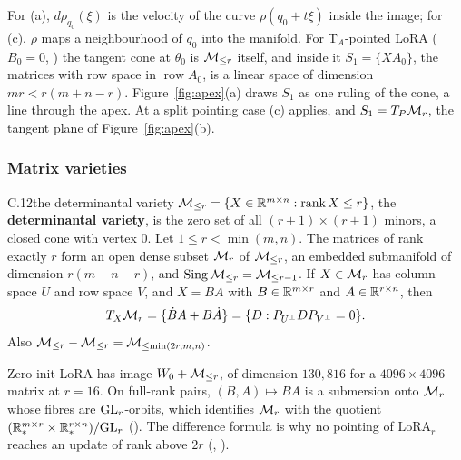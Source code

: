 For (a), $d\rho_{q_0}(\xi)$ is the velocity of the curve $\rho(q_0+t\xi)$ inside the image; for (c), $\rho$ maps a
neighbourhood of $q_0$ into the manifold. For $\mathrm T_A$-pointed LoRA ($B_0=0$, ) the tangent cone at
$\theta_0$ is $\mathcal{M}_{\le r}$ itself, and inside it $S_1=\{XA_0\}$, the matrices with row space in $\operatorname{row}A_0$, is a
linear space of dimension $mr<r(m+n-r)$. Figure~\ref{fig:apex}(a) draws $S_1$ as one ruling of the cone, a line through
the apex. At a split pointing case (c) applies, and $S_1=T_P\mathcal{M}_r$, the tangent plane of Figure~\ref{fig:apex}(b).


\subsubsection*{Matrix varieties}

\begin{bgentry}{C.12}{the determinantal variety}
$\mathcal{M}_{\le r}=\{X\in\mathbb{R}^{m\times n}:\operatorname{rank} X\le r\}$, the \textbf{determinantal variety}, is the zero set of all $(r+1)\times(r+1)$
minors, a closed cone with vertex $0$. Let $1\le r<\min(m,n)$. The matrices of rank exactly $r$ form an open dense
subset $\mathcal{M}_r$ of $\mathcal{M}_{\le r}$, an embedded submanifold of dimension $r(m+n-r)$, and $\operatorname{Sing}\mathcal{M}_{\le r}=\mathcal{M}_{\le r-1}$. If
$X\in\mathcal{M}_r$ has column space $U$ and row space $V$, and $X=BA$ with $B\in\mathbb{R}^{m\times r}$ and $A\in\mathbb{R}^{r\times n}$, then
\[T_X\mathcal{M}_r=\{\dot BA+B\dot A\}=\{D:P_{U^\perp}DP_{V^\perp}=0\}.\]
Also $\mathcal{M}_{\le r}-\mathcal{M}_{\le r}=\mathcal{M}_{\le\min(2r,m,n)}$.
\end{bgentry}

Zero-init LoRA has image $W_0+\mathcal{M}_{\le r}$, of dimension $130{,}816$ for a $4096\times4096$ matrix at $r=16$. On full-rank
pairs, $(B,A)\mapsto BA$ is a submersion onto $\mathcal{M}_r$ whose fibres are $\mathrm{GL}_r$-orbits, which identifies $\mathcal{M}_r$ with the
quotient $(\mathbb{R}^{m\times r}_*\times\mathbb{R}^{r\times n}_*)/\mathrm{GL}_r$ (). The difference formula is why no pointing of
$\mathrm{LoRA}_r$ reaches an update of rank above $2r$ (, ).


